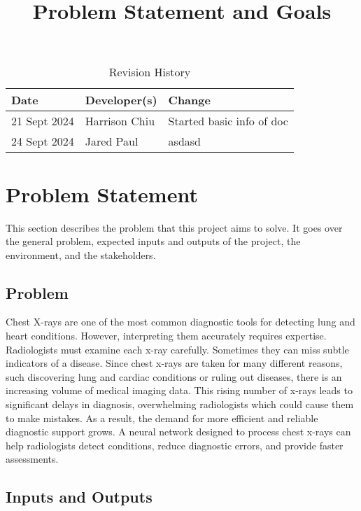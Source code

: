 \documentclass{article}
\title{Problem Statement and Goals\\\progname}
\author{\authname}
\date{}
\begin{document}
\maketitle

\begin{table}[hp]
\caption{Revision History} \label{TblRevisionHistory}
\begin{tabularx}{\textwidth}{llX}
\toprule
\textbf{Date} & \textbf{Developer(s)} & \textbf{Change}\\
\midrule
21 Sept 2024 & Harrison Chiu & Started basic info of doc \\
24 Sept 2024 & Jared Paul & asdasd \\
\bottomrule
\end{tabularx}
\end{table}

\section{Problem Statement}

This section describes the problem that this project aims to solve. It goes over the general
problem, expected inputs and outputs of the project, the environment, and the stakeholders.


\subsection{Problem}

Chest X-rays are one of the most common diagnostic tools for detecting lung and heart conditions.
However, interpreting them accurately requires expertise. Radiologists must examine each x-ray 
carefully. Sometimes they can miss subtle indicators of a disease. Since chest x-rays are taken
for many different reasons, such discovering lung and cardiac conditions or ruling out diseases, 
there is an increasing volume of medical imaging data. This rising number of x-rays leads to
significant delays in diagnosis, overwhelming radiologists which could cause them to make 
mistakes. As a result, the demand for more efficient and reliable diagnostic support grows. A 
neural network designed to process chest x-rays can help radiologists detect conditions, reduce 
diagnostic errors, and provide faster assessments.

\subsection{Inputs and Outputs}
\end{document}

